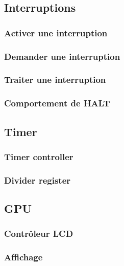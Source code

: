 \documentclass[a4paper]{article}
\begin{document}

\subsection{Interruptions}
\subsubsection{Activer une interruption}

\subsubsection{Demander une interruption}

\subsubsection{Traiter une interruption}

\subsubsection{Comportement de HALT}


\subsection{Timer}
\subsubsection{Timer controller}

\subsubsection{Divider register}



\subsection{GPU}
\subsubsection{Contrôleur LCD}

\subsubsection{Affichage}
\end{document}
